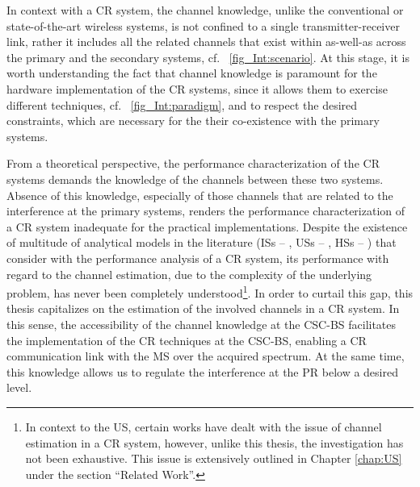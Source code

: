 In context with a CR system, the channel knowledge, unlike the conventional or state-of-the-art wireless systems, is not confined to a single transmitter-receiver link, rather it includes all the related channels that exist within as-well-as across the primary and the secondary systems, cf. \figurename~\ref{fig_Int:scenario}. At this stage, it is worth understanding the fact that channel knowledge is paramount for the hardware implementation of the CR systems, since it allows them to exercise different techniques, cf. \figurename~\ref{fig_Int:paradigm}, and to respect the desired constraints, which are necessary for the their co-existence with the primary systems. 

From a theoretical perspective, the performance characterization of the CR systems demands the knowledge of the channels between these two systems. Absence of this knowledge, especially of those channels that are related to the interference at the primary systems, renders the performance characterization of a CR system inadequate for the practical implementations. Despite the existence of multitude of analytical models in the literature (ISs -- \cite{Liang08, Sharma14, Pradhan15}, USs -- \cite{Xing07, Ghasemi07, Kang09}, HSs -- \cite{Song13, Gmira15, Jiang13, Fili15}) that consider with the performance analysis of a CR system, its performance with regard to the channel estimation, due to the complexity of the underlying problem, has never been completely understood\footnote{In context to the US, certain works \cite{Musa09, Suraweera10, Kim12} have dealt with the issue of channel estimation in a CR system, however, unlike this thesis, the investigation has not been exhaustive. This issue is extensively outlined in Chapter \ref{chap:US} under the section ``Related Work''.}. In order to curtail this gap, this thesis capitalizes on the estimation of the involved channels in a CR system. In this sense, the accessibility of the channel knowledge at the CSC-BS facilitates the implementation of the CR techniques at the CSC-BS, enabling a CR communication link with the MS over the acquired spectrum. At the same time, this knowledge allows us to regulate the interference at the PR below a desired level. 

